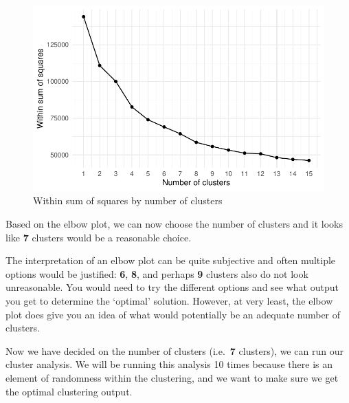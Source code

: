 \documentclass[
  letterpaper,
  DIV=11,
  numbers=noendperiod]{scrreprt}
\begin{document}
\begin{figure}[H]

{\centering \includegraphics{01-geodemographics_files/figure-pdf/fig-geo-variables-that-cluster-1.pdf}

}

\caption{\label{fig-geo-variables-that-cluster}Within sum of squares by
number of clusters}

\end{figure}

Based on the elbow plot, we can now choose the number of clusters and it
looks like \textbf{7} clusters would be a reasonable choice.

\begin{tcolorbox}[enhanced jigsaw, rightrule=.15mm, colback=white, opacityback=0, opacitybacktitle=0.6, coltitle=black, colbacktitle=quarto-callout-note-color!10!white, breakable, arc=.35mm, title=\textcolor{quarto-callout-note-color}{\faInfo}\hspace{0.5em}{Note}, left=2mm, leftrule=.75mm, bottomtitle=1mm, toprule=.15mm, bottomrule=.15mm, colframe=quarto-callout-note-color-frame, toptitle=1mm, titlerule=0mm]

The interpretation of an elbow plot can be quite subjective and often
multiple options would be justified: \textbf{6}, \textbf{8}, and perhaps
\textbf{9} clusters also do not look unreasonable. You would need to try
the different options and see what output you get to determine the
`optimal' solution. However, at very least, the elbow plot does give you
an idea of what would potentially be an adequate number of clusters.

\end{tcolorbox}

Now we have decided on the number of clusters (i.e.~\textbf{7}
clusters), we can run our cluster analysis. We will be running this
analysis 10 times because there is an element of randomness within the
clustering, and we want to make sure we get the optimal clustering
output.
\end{document}
